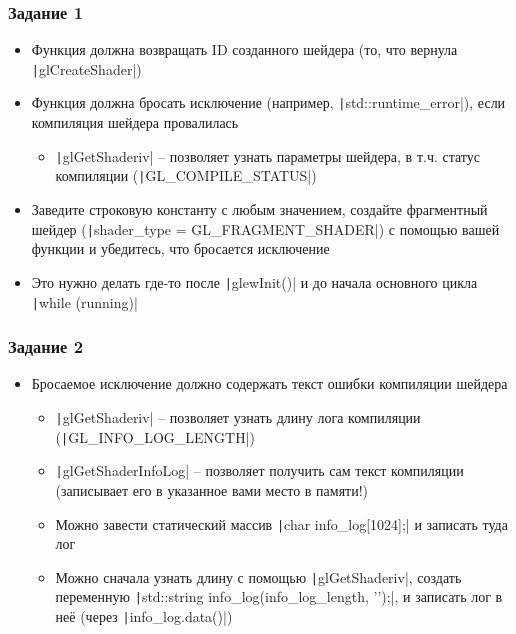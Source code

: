 \documentclass[10pt]{beamer}
\begin{document}
\begin{frame}[fragile]
\frametitle{Задание 1}
\begin{itemize}
\item Функция должна возвращать ID созданного шейдера (то, что вернула \texttt|glCreateShader|)
\item Функция должна бросать исключение (например, \texttt|std::runtime_error|), если компиляция шейдера провалилась
\begin{itemize}
\item \texttt|glGetShaderiv| -- позволяет узнать параметры шейдера, в т.ч. статус компиляции (\texttt|GL_COMPILE_STATUS|)
\end{itemize}
\item Заведите строковую константу с любым значением, создайте фрагментный шейдер (\texttt|shader_type = GL_FRAGMENT_SHADER|) с помощью вашей функции и убедитесь, что бросается исключение
\item Это нужно делать где-то после \texttt|glewInit()| и до начала основного цикла \texttt|while (running)|
\end{itemize}
\end{frame}

\begin{frame}[fragile]
\frametitle{Задание 2}
\begin{itemize}
\item Бросаемое исключение должно содержать текст ошибки компиляции шейдера
\begin{itemize}
\item \texttt|glGetShaderiv| -- позволяет узнать длину лога компиляции (\texttt|GL_INFO_LOG_LENGTH|)
\item \texttt|glGetShaderInfoLog| -- позволяет получить сам текст компиляции (записывает его в указанное вами место в памяти!)
\item Можно завести статический массив \texttt|char info_log[1024];| и записать туда лог
\item Можно сначала узнать длину с помощью \texttt|glGetShaderiv|, создать переменную \texttt|std::string info_log(info_log_length, '\0');|, и записать лог в неё (через \texttt|info_log.data()|)
\end{itemize}
\end{itemize}
\end{frame}
\end{document}
